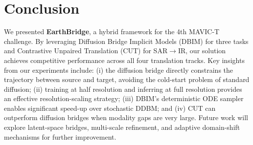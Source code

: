 \section{Conclusion}
\label{sec:conclusion}

We presented \textbf{EarthBridge}, a hybrid framework for the 4th MAVIC-T challenge. By leveraging Diffusion Bridge Implicit Models (DBIM) for three tasks and Contrastive Unpaired Translation (CUT) for SAR$\rightarrow$IR, our solution achieves competitive performance across all four translation tracks. Key insights from our experiments include: (i) the diffusion bridge directly constrains the trajectory between source and target, avoiding the cold-start problem of standard diffusion; (ii) training at half resolution and inferring at full resolution provides an effective resolution-scaling strategy; (iii) DBIM's deterministic ODE sampler enables significant speed-up over stochastic DDBM; and (iv) CUT can outperform diffusion bridges when modality gaps are very large. Future work will explore latent-space bridges, multi-scale refinement, and adaptive domain-shift mechanisms for further improvement.

